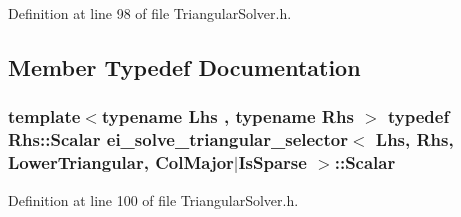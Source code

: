 Definition at line 98 of file Triangular\-Solver.\-h.



\subsection{Member Typedef Documentation}
\hypertarget{structei__solve__triangular__selector_3_01_lhs_00_01_rhs_00_01_lower_triangular_00_01_col_major_7_is_sparse_01_4_a05f3b1dcbf9ef46e965a7b8bebd0cb12}{
\subsubsection[{Scalar}]{\setlength{\rightskip}{0pt plus 5cm}template$<$typename Lhs , typename Rhs $>$ typedef Rhs\-::\-Scalar {\bf ei\-\_\-solve\-\_\-triangular\-\_\-selector}$<$ Lhs, Rhs, {\bf Lower\-Triangular}, {\bf Col\-Major}$|${\bf Is\-Sparse} $>$\-::{\bf Scalar}}}\label{structei__solve__triangular__selector_3_01_lhs_00_01_rhs_00_01_lower_triangular_00_01_col_major_7_is_sparse_01_4_a05f3b1dcbf9ef46e965a7b8bebd0cb12}


Definition at line 100 of file Triangular\-Solver.\-h.



